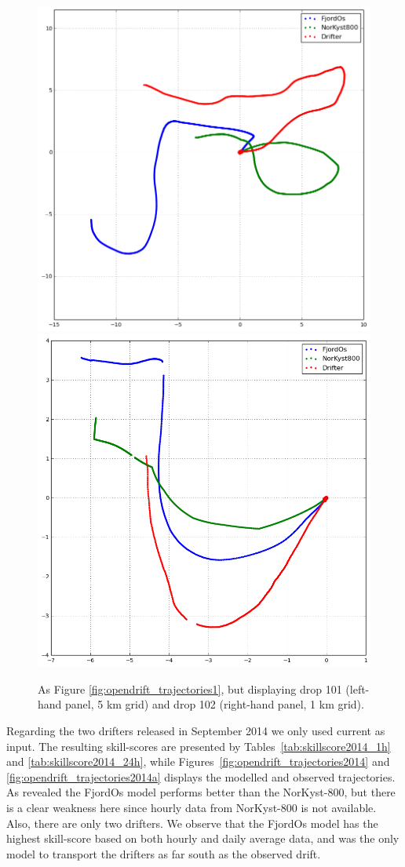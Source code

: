 \begin{figure}[htb]
	\centerline{
		\includegraphics*[width=.5\textwidth]{Figurer/opendrift/skillscore/drop101i6}
		\includegraphics*[width=.5\textwidth]{Figurer/opendrift/skillscore/drop102i9}
		}
	\caption{\small As Figure \ref{fig:opendrift_trajectories1}, but displaying drop 101 (left-hand panel, 5 km grid) and drop 102 (right-hand panel, 1 km grid).}
	\label{fig:opendrift_trajectories3}
\end{figure}

Regarding the two drifters released in September 2014 we only used current as input. The resulting skill-scores are presented by Tables~\ref{tab:skillscore2014_1h} and \ref{tab:skillscore2014_24h}, while Figures~\ref{fig:opendrift_trajectories2014} and \ref{fig:opendrift_trajectories2014a} displays the modelled and observed trajectories. As revealed the FjordOs model performs better than the NorKyst-800, but there is a clear weakness here since hourly data from NorKyst-800 is not available. Also, there are only two drifters. We observe that the FjordOs model has the highest skill-score based on both hourly and daily average data, and was the only model to transport the drifters as far south as the observed drift. 

